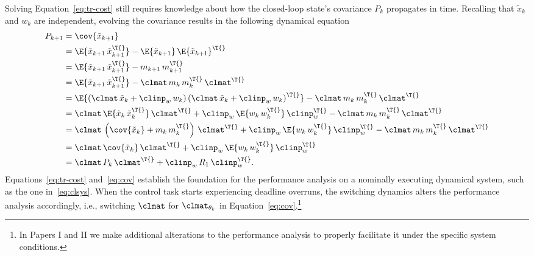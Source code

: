 Solving Equation~\eqref{eq:tr-cost} still requires knowledge about how the closed-loop state's covariance $P_k$ propagates in time.
Recalling that $\tilde{x}_k$ and $w_k$ are independent, evolving the covariance results in the following dynamical equation
%
\begin{equation}%
    \label{eq:cov}%
    \begin{aligned}
        P_{k+1} &= \cov{\tilde{x}_{k+1}} \\
        &= \E{\tilde{x}_{k+1}\,\tilde{x}_{k+1}^\T{}} - \E{\tilde{x}_{k+1}}\,\E{\tilde{x}_{k+1}}^\T{} \\
        &= \E{\tilde{x}_{k+1}\,\tilde{x}_{k+1}^\T{}} - m_{k+1}\,m_{k+1}^\T{} \\
        &= \E{\tilde{x}_{k+1}\,\tilde{x}_{k+1}^\T{}} - \clmat\, m_{k}\,m_{k}^\T{}\,\clmat^\T{} \\
        &= \E{ \left( \clmat\,\tilde{x}_k + \clinp_w\, w_k \right)\left( \clmat\,\tilde{x}_k + \clinp_w\, w_k \right)^\T{} } - \clmat\, m_{k}\,m_{k}^\T{}\,\clmat^\T{} \\
        &= \clmat\,\E{ \tilde{x}_k\,\tilde{x}_k^\T{} }\,\clmat^\T{} + \clinp_w\,\E{ w_k\,w_k^\T{} }\,\clinp_w^\T{} - \clmat\, m_{k}\,m_{k}^\T{}\,\clmat^\T{} \\
        &= \clmat\,\left( \cov{\tilde{x}_k} + m_k\,m_k^\T{} \right)\,\clmat^\T{} + \clinp_w\,\E{ w_k\,w_k^\T{} }\,\clinp_w^\T{} - \clmat\, m_k\,m_{k}^\T{}\,\clmat^\T{} \\
        &= \clmat\,\cov{\tilde{x}_k}\,\clmat^\T{} + \clinp_w\,\E{ w_k\,w_k^\T{} }\,\clinp_w^\T{} \\
        &= \clmat\,P_k\,\clmat^\T{} + \clinp_w\,R_1\,\clinp_w^\T{}.
    \end{aligned}
\end{equation}
%
Equations~\eqref{eq:tr-cost} and~\eqref{eq:cov} establish the foundation for the performance analysis on a nominally executing dynamical system, such as the one in~\eqref{eq:clsys}.
When the control task starts experiencing deadline overruns, the switching dynamics alters the performance analysis accordingly, i.e., switching $\clmat$ for $\clmat_{\theta_k}$ in Equation~\eqref{eq:cov}.\footnote{In Papers I and II we make additional alterations to the performance analysis to properly facilitate it under the specific system conditions.}

